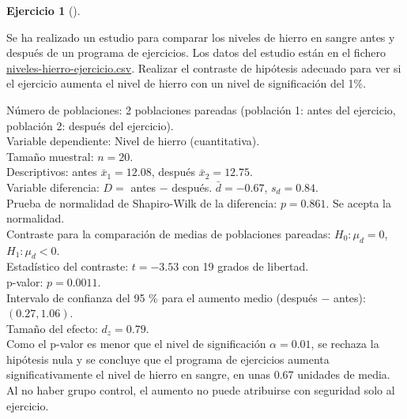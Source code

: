 \documentclass[
  spanish,
  a4paper,
]{scrreport}
\theoremstyle{definition}
\newtheorem{exercise}{Ejercicio}[chapter]
\theoremstyle{remark}
\begin{document}
\begin{exercise}[]\protect\hypertarget{exr-contraste-comparacion-medias-pareadas-hierro}{}\label{exr-contraste-comparacion-medias-pareadas-hierro}

Se ha realizado un estudio para comparar los niveles de hierro en sangre
antes y después de un programa de ejercicios. Los datos del estudio
están en el fichero
\href{datos/niveles-hierro-ejercicio.csv}{niveles-hierro-ejercicio.csv}.
Realizar el contraste de hipótesis adecuado para ver si el ejercicio
aumenta el nivel de hierro con un nivel de significación del 1\%.

\end{exercise}

\begin{tcolorbox}[enhanced jigsaw, arc=.35mm, bottomrule=.15mm, bottomtitle=1mm, breakable, colback=white, colbacktitle=quarto-callout-tip-color!10!white, colframe=quarto-callout-tip-color-frame, coltitle=black, left=2mm, leftrule=.75mm, opacityback=0, opacitybacktitle=0.6, rightrule=.15mm, title=\textcolor{quarto-callout-tip-color}{\faLightbulb}\hspace{0.5em}{Solución}, titlerule=0mm, toprule=.15mm, toptitle=1mm]

Número de poblaciones: 2 poblaciones pareadas (población 1: antes del
ejercicio, población 2: después del ejercicio).\\
Variable dependiente: Nivel de hierro (cuantitativa).\\
Tamaño muestral: \(n=20\).\\
Descriptivos: antes \(\bar x_1=12.08\), después \(\bar x_2=12.75\).\\
Variable diferencia: \(D=\) antes \(-\) después. \(\bar d=-0.67\),
\(s_d=0.84\).\\
Prueba de normalidad de Shapiro-Wilk de la diferencia: \(p=0.861\). Se
acepta la normalidad.\\
Contraste para la comparación de medias de poblaciones pareadas:
\(H_0:\mu_d=0\), \(H_1:\mu_d<0\).\\
Estadístico del contraste: \(t=-3.53\) con 19 grados de libertad.\\
p-valor: \(p=0.0011\).\\
Intervalo de confianza del 95 \% para el aumento medio (después \(-\)
antes): \((0.27, 1.06)\).\\
Tamaño del efecto: \(d_z=0.79\).\\
Como el p-valor es menor que el nivel de significación \(\alpha=0.01\),
se rechaza la hipótesis nula y se concluye que el programa de ejercicios
aumenta significativamente el nivel de hierro en sangre, en unas 0.67
unidades de media. Al no haber grupo control, el aumento no puede
atribuirse con seguridad solo al ejercicio.

\end{tcolorbox}
\end{document}

